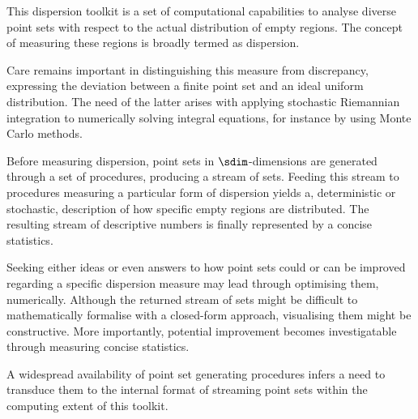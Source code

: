 This dispersion toolkit is a set of computational capabilities to analyse diverse  point sets with respect to the actual distribution of empty regions. The concept of measuring these regions is broadly termed as dispersion.

Care remains important in distinguishing this measure from discrepancy, expressing the deviation between a finite point set and an ideal uniform distribution. The need of the latter arises with applying stochastic Riemannian integration to numerically solving integral equations, for instance by using Monte Carlo methods.

Before measuring dispersion, point sets in $\sdim$-dimensions are generated through a set of procedures, producing a stream of sets. Feeding this stream to procedures measuring a particular form of dispersion yields a, deterministic or stochastic, description of how specific empty regions are distributed. The resulting stream of descriptive numbers is finally represented by a concise statistics.

Seeking either ideas or even answers to how point sets could or can be improved regarding a specific dispersion measure may lead through optimising them, numerically. Although the returned stream of sets might be difficult to mathematically formalise with a closed-form approach, visualising them might be constructive. More importantly, potential improvement becomes investigatable through measuring concise statistics.

A widespread availability of point set generating procedures infers a need to transduce them to the internal format of streaming point sets within the computing extent of this toolkit.
